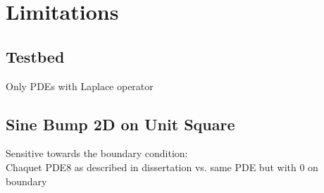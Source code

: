 \documentclass[./\jobname.tex]{subfiles}
\begin{document}
\chapter{Limitations}

\section{Testbed}
Only PDEs with Laplace operator

\section{Sine Bump 2D on Unit Square}
Sensitive towards the boundary condition: \\
Chaquet PDE8 as described in dissertation vs. same PDE but with 0 on boundary
\end{document}
